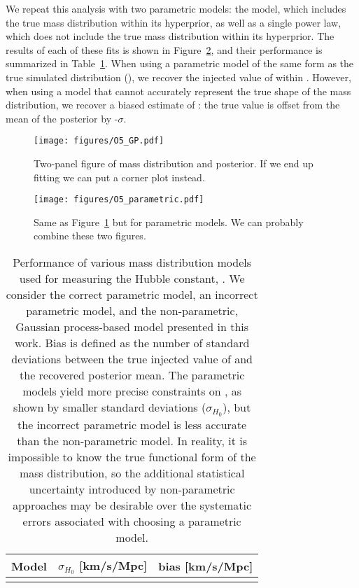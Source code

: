 \documentclass[]{aastex631}
\begin{document}
We repeat this analysis with two parametric models: the \plp{} model, which includes the true mass distribution within its hyperprior, as well as a single power law, which does not include the true mass distribution within its hyperprior.
The results of each of these fits is shown in Figure~\ref{fig:O5_parametric}, and their performance is summarized in Table~\ref{tab:bias}.
When using a parametric model of the same form as the true simulated distribution (\plp), we recover the injected value of \Ho{} within .
However, when using a model that cannot accurately represent the true shape of the mass distribution, we recover a biased estimate of \Ho: the true value is offset from the mean of the posterior by -$\sigma$.

\begin{figure}
    \centering
    \texttt{[image: figures/O5\_GP.pdf]}
    \caption{Two-panel figure of mass distribution and \Ho{} posterior. If we end up fitting \Omm{} we can put a corner plot instead.}
    \label{fig:O5_GP}
\end{figure}

\begin{figure}
    \centering
    \texttt{[image: figures/O5\_parametric.pdf]}
    \caption{Same as Figure~\ref{fig:O5_GP} but for parametric models. We can probably combine these two figures.}
    \label{fig:O5_parametric}
\end{figure}

\begin{table}[]
    \centering
    \begin{tabular}{c|c c}
         Model & $\sigma_{H_0}$ [km/s/Mpc] & bias [km/s/Mpc]\\
         \hline
         & 
    \end{tabular}
    \caption{Performance of various mass distribution models used for measuring the Hubble constant, \Ho.
    We consider the correct parametric model, an incorrect parametric model, and the non-parametric, Gaussian process-based model presented in this work.
    Bias is defined as the number of standard deviations between the true injected value of \Ho and the recovered posterior mean. 
    The parametric models yield more precise constraints on \Ho{}, as shown by smaller standard deviations ($\sigma_{H_0}$), but the incorrect parametric model is less accurate than the non-parametric model.
    In reality, it is impossible to know the true functional form of the mass distribution, so the additional statistical uncertainty introduced by non-parametric approaches may be desirable over the systematic errors associated with choosing a parametric model.
    }
    \label{tab:bias}
\end{table}
\end{document}
